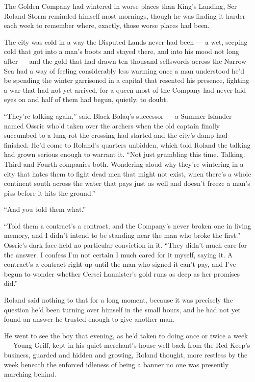 The Golden Company had wintered in worse places than King’s Landing, Ser Roland Storm reminded himself most mornings, though he was finding it harder each week to remember where, exactly, those worse places had been.

The city was cold in a way the Disputed Lands never had been — a wet, seeping cold that got into a man’s boots and stayed there, and into his mood not long after — and the gold that had drawn ten thousand sellswords across the Narrow Sea had a way of feeling considerably less warming once a man understood he’d be spending the winter garrisoned in a capital that resented his presence, fighting a war that had not yet arrived, for a queen most of the Company had never laid eyes on and half of them had begun, quietly, to doubt.

“They’re talking again,” said Black Balaq’s successor — a Summer Islander named Ossric who’d taken over the archers when the old captain finally succumbed to a lung-rot the crossing had started and the city’s damp had finished. He’d come to Roland’s quarters unbidden, which told Roland the talking had grown serious enough to warrant it. “Not just grumbling this time. Talking. Third and Fourth companies both. Wondering aloud why they’re wintering in a city that hates them to fight dead men that might not exist, when there’s a whole continent south across the water that pays just as well and doesn’t freeze a man’s piss before it hits the ground.”

“And you told them what.”

“Told them a contract’s a contract, and the Company’s never broken one in living memory, and I didn’t intend to be standing near the man who broke the first.” Ossric’s dark face held no particular conviction in it. “They didn’t much care for the answer. I confess I’m not certain I much cared for it myself, saying it. A contract’s a contract right up until the man who signed it can’t pay, and I’ve begun to wonder whether Cersei Lannister’s gold runs as deep as her promises did.”

Roland said nothing to that for a long moment, because it was precisely the question he’d been turning over himself in the small hours, and he had not yet found an answer he trusted enough to give another man.

\sceneBreak

He went to see the boy that evening, as he’d taken to doing once or twice a week — Young Griff, kept in his quiet merchant’s house well back from the Red Keep’s business, guarded and hidden and growing, Roland thought, more restless by the week beneath the enforced idleness of being a banner no one was presently marching behind.

